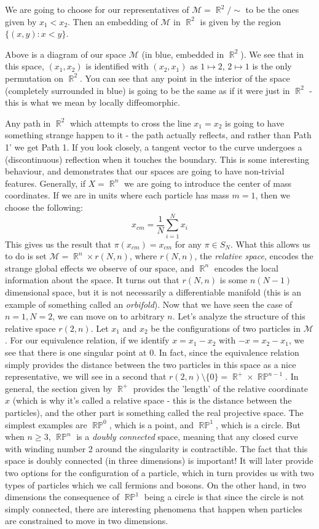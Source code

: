 \documentclass{article}
\DeclareMathOperator{\RR}{\mathbb{R}}
\DeclareMathOperator{\RP}{\mathbb{RP}}
\begin{document}
We are going to choose for our representatives of $\mathcal{M} = \RR^2/\sim$ to be the ones given by $x_1 < x_2$. Then an embedding of $\mathcal{M}$ in $\RR^2$ is given by the region $\{(x,y):x<y\}$.

Above is a diagram of our space $\mathcal{M}$ (in blue, embedded in $\RR^2$). We see that in this space, $(x_1,x_2)$ is identified with $(x_2,x_1)$ as $1\mapsto 2$, $2\mapsto 1$ is the only permutation on $\RR^2$. You can see that any point in the interior of the space (completely surrounded in blue) is going to be the same as if it were just in $\RR^2$ - this is what we mean by locally diffeomorphic.


Any path in $\RR^2$ which attempts to cross the line $x_1=x_2$ is going to have something strange happen to it - the path actually reflects, and rather than Path 1' we get Path 1. If you look closely, a tangent vector to the curve undergoes a (discontinuous) reflection when it touches the boundary. This is some interesting behaviour, and demonstrates that our spaces are going to have non-trivial features.
Generally, if $X = \RR^n$ we are going to introduce the center of mass coordinates. If we are in units where each particle has mass $m=1$, then we choose the following:
\[x_{cm} = \frac{1}{N}\sum_{i=1}^N x_i\]
This gives us the result that $\pi(x_{cm}) = x_{cm}$ for any $\pi \in S_N$. What this allows us to do is set $\mathcal{M} = \RR^n \times r(N,n)$, where $r(N,n)$, the \textit{relative space}, encodes the strange global effects we observe of our space, and $\RR^n$ encodes the local information about the space. It turns out that $r(N,n)$ is some $n(N-1)$ dimensional space, but it is not necessarily a differentiable manifold (this is an example of something called an \textit{orbifold}). Now that we have seen the case of $n=1, N=2$, we can move on to arbitrary $n$. Let's analyze the structure of this relative space $r(2,n)$. Let $x_1$ and $x_2$ be the configurations of two particles in $\mathcal{M}$. For our equivalence relation, if we identify $x = x_1 - x_2$ with $-x = x_2 - x_1$, we see that there is one singular point at $0$. In fact, since the equivalence relation simply provides the distance between the two particles in this space as a nice representative, we will see in a second that $r(2,n) \setminus \{0\} = \RR^{+} \times {\RP}^{n-1}$. In general, the section given by $\RR^+$ provides the 'length' of the relative coordinate $x$ (which is why it's called a relative space - this is the distance between the particles), and the other part is something called the real projective space. The simplest examples are $\RP^0$, which is a point, and $\RP^1$, which is a circle. But when $n\geq 3$, $\RP^n$ is a \textit{doubly connected} space, meaning that any closed curve with winding number 2 around the singularity is contractible. The fact that this space is doubly connected (in three dimensions) is important! It will later provide two options for the configuration of a particle, which in turn provides us with two types of particles which we call fermions and bosons. On the other hand, in two dimensions the consequence of $\RP^1$ being a circle is that since the circle is not simply connected, there are interesting phenomena that happen when particles are constrained to move in two dimensions.
\end{document}

